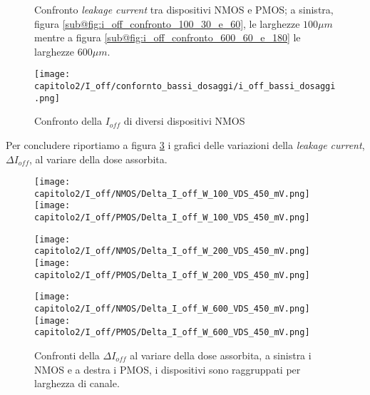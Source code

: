 \begin{figure}[h]
    \centering

    \caption[Confronto \textit{leakage current} tra dispositivi NMOS e PMOS]{Confronto \textit{leakage current} tra dispositivi NMOS e PMOS; a sinistra, figura \ref{sub@fig:i_off_confronto_100_30_e_60}, le larghezze $100\mu m$ mentre a figura \ref{sub@fig:i_off_confronto_600_60_e_180} le larghezze $600\mu m$.}
    \label{fig:i_off_confronto}
    
\end{figure}


\begin{figure}[h]
    \centering

    \texttt{[image: capitolo2/I\_off/confornto\_bassi\_dosaggi/i\_off\_bassi\_dosaggi.png]}
    \caption[Confronto della $I_{off}$ di diversi dispositivi NMOS]{Confronto della $I_{off}$ di diversi dispositivi NMOS}
    \label{fig:i_off_confronto_bassi_dosaggi}

\end{figure}

Per concludere riportiamo a figura \ref{fig:delta_i_off} i grafici delle variazioni della \textit{leakage current}, $\Delta I_{off}$, al variare della dose assorbita.

\begin{figure}[ht]
    
    \texttt{[image: capitolo2/I\_off/NMOS/Delta\_I\_off\_W\_100\_VDS\_450\_mV.png]}
    \texttt{[image: capitolo2/I\_off/PMOS/Delta\_I\_off\_W\_100\_VDS\_450\_mV.png]}
    
    \vspace{0.5cm}

    \texttt{[image: capitolo2/I\_off/NMOS/Delta\_I\_off\_W\_200\_VDS\_450\_mV.png]}
    \texttt{[image: capitolo2/I\_off/PMOS/Delta\_I\_off\_W\_200\_VDS\_450\_mV.png]}
    
    \vspace{0.5cm}

    \texttt{[image: capitolo2/I\_off/NMOS/Delta\_I\_off\_W\_600\_VDS\_450\_mV.png]}
    \texttt{[image: capitolo2/I\_off/PMOS/Delta\_I\_off\_W\_600\_VDS\_450\_mV.png]}
    
    \caption[$\Delta I_{off}$ al variare della dose assorbita, NMOS e PMOS]{Confronti della $\Delta I_{off}$ al variare della dose assorbita, a sinistra i NMOS e a destra i PMOS, i dispositivi sono raggruppati per larghezza di canale.}
    \label{fig:delta_i_off}
\end{figure}